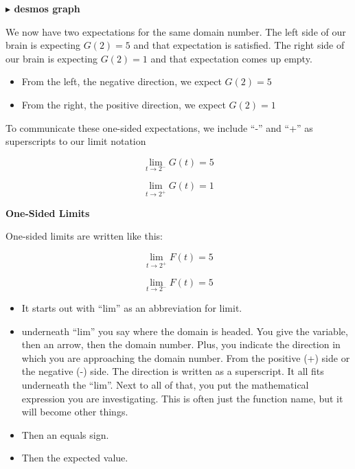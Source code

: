 \documentclass{ximera}
\begin{document}
\begin{onlineOnly}
\textbf{\textcolor{blue!55!black}{$\blacktriangleright$ desmos graph}} 
\begin{center}
\end{center}
\end{onlineOnly}


We now have two expectations for the same domain number. The left side of our brain is expecting $G(2)=5$ and that expectation is satisfied.  The right side of our brain is expecting $G(2)=1$ and that expectation comes up empty. 




\begin{itemize}
\item From the left, the negative direction, we expect $G(2)=5$
\item From the right, the positive direction, we expect $G(2)=1$
\end{itemize}


To communicate these one-sided expectations, we include ``-'' and ``+'' as superscripts to our limit notation 




\[   \lim\limits_{t \to 2^-} G(t) = 5 \]



\[   \lim\limits_{t \to 2^+} G(t) = 1 \]





\begin{notation} \textbf{\textcolor{red!50!green}{One-Sided Limits}} 

One-sided limits are written like this:

\textbf{\textcolor{red!70!black}{
\[   \lim\limits_{t \to 2^+} F(t) = 5\]
}}


\textbf{\textcolor{red!70!black}{
\[   \lim\limits_{t \to 2^-} F(t) = 5\]
}}


\begin{itemize}
\item It starts out with ``lim'' as an abbreviation for limit.
\item underneath ``lim'' you say where the domain is headed.  You give the variable, then an arrow, then the domain number.  Plus, you indicate the direction in which you are approaching the domain number. From the positive (+) side or the negative (-) side. The direction is written as a superscript. It all fits underneath the ``lim''.
\tem Next to all of that, you put the mathematical expression you are investigating.  This is often just the function name, but it will become other things.
\item Then an equals sign.
\item Then the expected value.

\end{itemize}


\end{notation}
\end{document}
